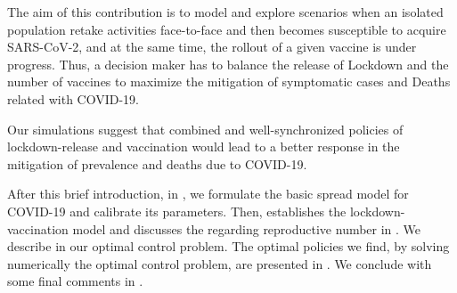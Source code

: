     The aim of this contribution is to model and explore scenarios when an
isolated population retake activities face-to-face and then becomes susceptible
to acquire SARS-CoV-2, and at the same time, the rollout of a given vaccine is
under progress. Thus, a decision maker has to balance the release of Lockdown
and the number of vaccines to maximize the mitigation of symptomatic cases and
Deaths related with COVID-19.

    Our simulations suggest that combined and well-synchronized policies of
lockdown-release and vaccination would lead to a better response in the
mitigation of prevalence and deaths due to COVID-19.

    After this brief introduction, in , we formulate
the basic spread model for COVID-19 and calibrate its parameters. Then,
 establishes the lockdown-vaccination model and
discusses the regarding reproductive number in .
We describe in  our optimal control problem.
The optimal policies we find, by solving numerically the optimal control
problem, are presented in .
We conclude with some final comments in .

